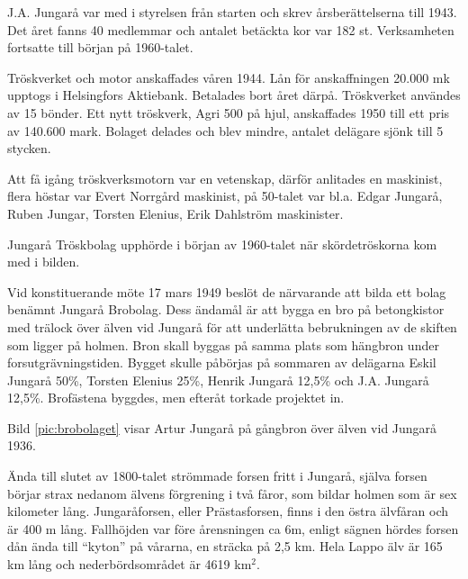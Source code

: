 J.A. Jungarå var med i styrelsen från starten och skrev årsberättelserna till 1943. Det året fanns 40 medlemmar och antalet betäckta kor var 182 st. Verksamheten fortsatte till början 	på 1960-talet.



%


Tröskverket och motor anskaffades våren 1944. Lån för anskaffningen 20.000 mk upptogs i Helsingfors Aktiebank. Betalades bort året därpå. Tröskverket användes av 15 bönder. Ett nytt tröskverk, Agri 500 på hjul, anskaffades 1950 till ett pris av 140.600 mark. Bolaget delades och blev mindre, antalet delägare sjönk till 5 stycken.

Att få igång tröskverksmotorn var en vetenskap, därför anlitades en maskinist, flera höstar var Evert Norrgård maskinist, på 50-talet var bl.a. Edgar Jungarå, Ruben Jungar, Torsten Elenius, Erik Dahlström maskinister.

Jungarå Tröskbolag upphörde i början av 1960-talet när skördetröskorna kom med i bilden.



%


Vid konstituerande möte 17 mars 1949 beslöt de närvarande att bilda ett bolag benämnt Jungarå Brobolag. Dess ändamål är att bygga en bro på betongkistor med trälock över älven vid Jungarå för att underlätta 		 bebrukningen av de skiften som ligger på holmen. Bron skall byggas på samma plats som hängbron under  forsutgrävningstiden. Bygget skulle påbörjas på sommaren av delägarna Eskil Jungarå 50\%, Torsten Elenius 25\%, Henrik Jungarå 12,5\% och J.A. Jungarå 12,5\%. Brofästena byggdes, men efteråt torkade projektet in.

Bild \ref{pic:brobolaget} visar Artur Jungarå på gångbron över älven vid Jungarå 1936.\jhvspace[5]



%


Ända till slutet av 1800-talet strömmade forsen fritt i Jungarå, själva forsen börjar strax nedanom älvens förgrening i två fåror, som bildar holmen som är sex kilometer lång. Jungaråforsen, eller Prästasforsen, finns i den östra älvfåran och är 400 m lång. Fallhöjden var före årensningen ca 6m, enligt sägnen hördes forsen dån ända till ``kyton'' på vårarna, en  sträcka på 2,5 km. Hela Lappo älv är 165 km lång och nederbördsområdet är 4619 km$^2$.


